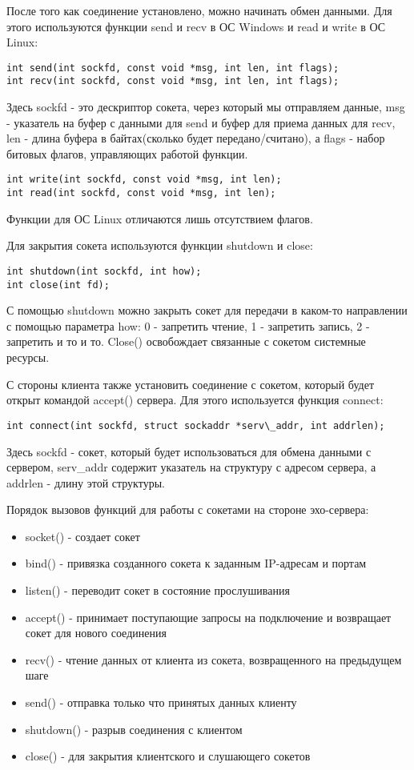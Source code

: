 После того как соединение установлено, можно начинать обмен данными. Для этого используются функции send и recv в ОС Windows и read и write в ОС Linux:
\begin{lstlisting}
int send(int sockfd, const void *msg, int len, int flags);
int recv(int sockfd, const void *msg, int len, int flags);
\end{lstlisting}
Здесь sockfd - это дескриптор сокета, через который мы отправляем данные, msg - указатель на буфер с данными для send и буфер для приема данных для recv, len - длина буфера в байтах(сколько будет передано/считано), а flags - набор битовых флагов, управляющих работой функции.
\begin{lstlisting}
int write(int sockfd, const void *msg, int len);
int read(int sockfd, const void *msg, int len);
\end{lstlisting}
Функции для ОС Linux отличаются лишь отсутствием флагов.

Для закрытия сокета используются функции shutdown и close:
\begin{lstlisting}
int shutdown(int sockfd, int how);
int close(int fd);
\end{lstlisting}
С помощью shutdown можно закрыть сокет для передачи в каком-то направлении с помощью параметра how: 0 - запретить чтение, 1 - запретить запись, 2 - запретить и то и то.
Close() освобождает связанные с сокетом системные ресурсы.

С стороны клиента также установить соединение с сокетом, который будет открыт командой accept() сервера. Для этого используется функция connect:
\begin{lstlisting}
int connect(int sockfd, struct sockaddr *serv\_addr, int addrlen);
\end{lstlisting}
Здесь sockfd - сокет, который будет использоваться для обмена данными с сервером, serv\_addr содержит указатель на структуру с адресом сервера, а addrlen - длину этой структуры.

Порядок вызовов функций для работы с сокетами на стороне эхо-сервера:
\begin{itemize}
\item socket() - создает сокет
\item bind() - привязка созданного сокета к заданным IP-адресам и портам
\item listen() - переводит сокет в состояние прослушивания
\item accept() - принимает поступающие запросы на подключение и возвращает сокет для нового соединения
\item recv() - чтение данных от клиента из сокета, возвращенного на предыдущем шаге
\item send() - отправка только что принятых данных клиенту
\item shutdown() - разрыв соединения с клиентом
\item close() - для закрытия клиентского и слушающего сокетов
\end{itemize}

